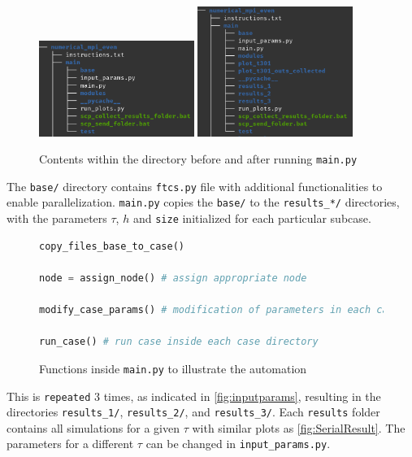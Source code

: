 \begin{figure}[H]
    \centering
    \includegraphics[width=0.45\textwidth]{figures/parallel_dir0.png}
    \includegraphics[width=0.45\textwidth]{figures/parallel_dir1.png}
    \caption{Contents within the directory before and after running \texttt{main.py}}
\end{figure}

The \texttt{base/} directory contains \texttt{ftcs.py} file with additional functionalities to enable parallelization. \texttt{main.py} copies the \texttt{base/} to the \texttt{results\_*/} directories, with the parameters $\tau$, $h$ and \texttt{size} initialized for each particular subcase.

\begin{figure}[H]
\begin{lstlisting}[language=Python]
copy_files_base_to_case()

node = assign_node() # assign appropriate node

modify_case_params() # modification of parameters in each case

run_case() # run case inside each case directory
\end{lstlisting}
\caption{Functions inside \texttt{main.py} to illustrate the automation}
\label{fig:mainpy}
\end{figure}

This is \texttt{repeated} 3 times, as indicated in \autoref{fig:inputparams}, resulting in the directories \texttt{results\_1/}, \texttt{results\_2/}, and \texttt{results\_3/}. Each \texttt{results} folder contains all simulations for a given $\tau$ with similar plots as \autoref{fig:SerialResult}. The parameters for a different $\tau$ can be changed in \texttt{input\_params.py}.

